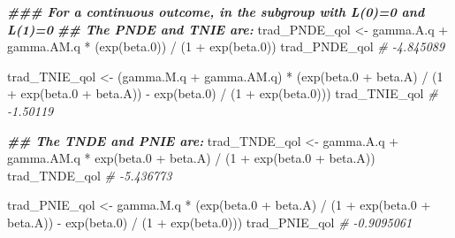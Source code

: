 \documentclass[
]{book}
\newenvironment{Shaded}{\begin{snugshade}}{\end{snugshade}}
\newcommand{\CommentTok}[1]{\textcolor[rgb]{0.56,0.35,0.01}{\textit{#1}}}
\newcommand{\DecValTok}[1]{\textcolor[rgb]{0.00,0.00,0.81}{#1}}
\newcommand{\DocumentationTok}[1]{\textcolor[rgb]{0.56,0.35,0.01}{\textbf{\textit{#1}}}}
\newcommand{\FloatTok}[1]{\textcolor[rgb]{0.00,0.00,0.81}{#1}}
\newcommand{\FunctionTok}[1]{\textcolor[rgb]{0.00,0.00,0.00}{#1}}
\newcommand{\NormalTok}[1]{#1}
\newcommand{\OtherTok}[1]{\textcolor[rgb]{0.56,0.35,0.01}{#1}}
\newcommand{\SpecialCharTok}[1]{\textcolor[rgb]{0.00,0.00,0.00}{#1}}
\begin{document}
\begin{Shaded}
\begin{Highlighting}[]
\DocumentationTok{\#\#\# For a continuous outcome, in the subgroup with L(0)=0 and L(1)=0}
\DocumentationTok{\#\# The PNDE and TNIE are:}
\NormalTok{trad\_PNDE\_qol }\OtherTok{\textless{}{-}}\NormalTok{ gamma.A.q }\SpecialCharTok{+}\NormalTok{ gamma.AM.q }\SpecialCharTok{*}\NormalTok{ (}\FunctionTok{exp}\NormalTok{(beta}\FloatTok{.0}\NormalTok{)) }\SpecialCharTok{/}\NormalTok{ (}\DecValTok{1} \SpecialCharTok{+} \FunctionTok{exp}\NormalTok{(beta}\FloatTok{.0}\NormalTok{))}
\NormalTok{trad\_PNDE\_qol}
\CommentTok{\# {-}4.845089}

\NormalTok{trad\_TNIE\_qol }\OtherTok{\textless{}{-}}\NormalTok{ (gamma.M.q }\SpecialCharTok{+}\NormalTok{ gamma.AM.q) }\SpecialCharTok{*}
\NormalTok{  (}\FunctionTok{exp}\NormalTok{(beta}\FloatTok{.0} \SpecialCharTok{+}\NormalTok{ beta.A) }\SpecialCharTok{/}\NormalTok{ (}\DecValTok{1} \SpecialCharTok{+} \FunctionTok{exp}\NormalTok{(beta}\FloatTok{.0} \SpecialCharTok{+}\NormalTok{ beta.A)) }\SpecialCharTok{{-}}
     \FunctionTok{exp}\NormalTok{(beta}\FloatTok{.0}\NormalTok{) }\SpecialCharTok{/}\NormalTok{ (}\DecValTok{1} \SpecialCharTok{+} \FunctionTok{exp}\NormalTok{(beta}\FloatTok{.0}\NormalTok{)))}
\NormalTok{trad\_TNIE\_qol}
\CommentTok{\# {-}1.50119}

\DocumentationTok{\#\# The TNDE and PNIE are:}
\NormalTok{trad\_TNDE\_qol }\OtherTok{\textless{}{-}}\NormalTok{ gamma.A.q }\SpecialCharTok{+}
\NormalTok{  gamma.AM.q }\SpecialCharTok{*} \FunctionTok{exp}\NormalTok{(beta}\FloatTok{.0} \SpecialCharTok{+}\NormalTok{ beta.A) }\SpecialCharTok{/}\NormalTok{ (}\DecValTok{1} \SpecialCharTok{+} \FunctionTok{exp}\NormalTok{(beta}\FloatTok{.0} \SpecialCharTok{+}\NormalTok{ beta.A))}
\NormalTok{trad\_TNDE\_qol}
\CommentTok{\# {-}5.436773}

\NormalTok{trad\_PNIE\_qol }\OtherTok{\textless{}{-}}\NormalTok{ gamma.M.q }\SpecialCharTok{*}
\NormalTok{  (}\FunctionTok{exp}\NormalTok{(beta}\FloatTok{.0} \SpecialCharTok{+}\NormalTok{ beta.A) }\SpecialCharTok{/}
\NormalTok{     (}\DecValTok{1} \SpecialCharTok{+} \FunctionTok{exp}\NormalTok{(beta}\FloatTok{.0} \SpecialCharTok{+}\NormalTok{ beta.A)) }\SpecialCharTok{{-}} \FunctionTok{exp}\NormalTok{(beta}\FloatTok{.0}\NormalTok{) }\SpecialCharTok{/}\NormalTok{ (}\DecValTok{1} \SpecialCharTok{+} \FunctionTok{exp}\NormalTok{(beta}\FloatTok{.0}\NormalTok{)))}
\NormalTok{trad\_PNIE\_qol}
\CommentTok{\# {-}0.9095061}
\end{Highlighting}
\end{Shaded}
\end{document}

